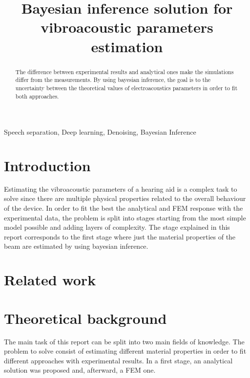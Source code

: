 \documentclass{article}
\title{Bayesian inference solution for vibroacoustic parameters estimation}
\begin{document}
%

\maketitle
%
\begin{abstract}
The difference between experimental results and analytical ones make the simulations differ from the measurements. By using bayesian inference, the goal is to  the uncertainty between the theoretical values of electroacoustics parameters in order to fit both approaches.  
\end{abstract}
%
\begin{keywords}
Speech separation, Deep learning, Denoising, Bayesian Inference
\end{keywords}
%
\section{Introduction}
\label{sec:intro}
Estimating the vibroacoustic parameters of a hearing aid is a complex task to solve since there are multiple physical properties related to the overall behaviour of the device. In order to fit the best the analytical and FEM response with the experimental data, the problem is split into stages starting from the most simple model possible and adding layers of complexity. The stage explained in this report corresponds to the first stage where just the material properties of the beam are estimated by using bayesian inference. 

\section{Related work}
\label{sec:format}


\section{Theoretical background}
The main task of this report can be split into two main fields of knowledge. The problem to solve consist of estimating different material properties in order to fit different approaches with experimental results. In a first stage, an analytical solution was proposed and, afterward, a FEM one.
\end{document}
